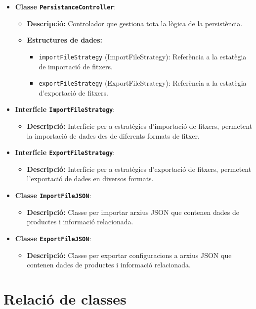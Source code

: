 \documentclass[a4paper,12pt]{report}
\begin{document}
\begin{itemize}
	\item \textbf{Classe \texttt{PersistanceController}}:
		\begin{itemize}
			\item \textbf{Descripció:} Controlador que gestiona tota la lògica de la persistència.
			\item \textbf{Estructures de dades:}
			\begin{itemize}
				\item \texttt{importFileStrategy} (ImportFileStrategy): Referència a la estatègia de importació de fitxers.
				\item \texttt{exportFileStrategy} (ExportFileStrategy): Referència a la estatègia d'exportació de fitxers.
			\end{itemize}
		\end{itemize}	
	\item \textbf{Interfície \texttt{ImportFileStrategy}}:
		\begin{itemize}
			\item \textbf{Descripció:} Interfície per a estratègies d'importació de fitxers, permetent la importació de dades des de diferents formats de fitxer.
		\end{itemize}
	\item \textbf{Interfície \texttt{ExportFileStrategy}}:
		\begin{itemize}
			\item \textbf{Descripció:} Interfície per a estratègies d'exportació de fitxers, permetent l'exportació de dades en diversos formats.
		\end{itemize}
	\item \textbf{Classe \texttt{ImportFileJSON}}:
	      \begin{itemize}
		      \item \textbf{Descripció:} Classe per importar arxius JSON que contenen dades de productes i informació relacionada.
	      \end{itemize}
	\item \textbf{Classe \texttt{ExportFileJSON}}:
	      \begin{itemize}
		      \item \textbf{Descripció:} Classe per exportar configuracions a arxius JSON que contenen dades de productes i informació relacionada.
	      \end{itemize}
\end{itemize}

\section{Relació de classes}
\end{document}
